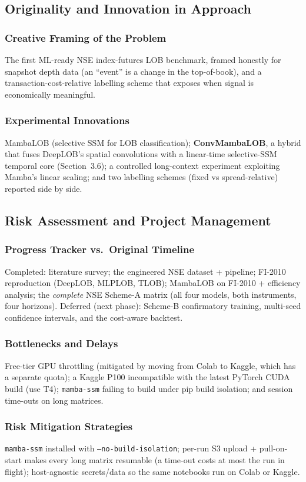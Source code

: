 \documentclass[11pt]{article}
\begin{document}
\subsection{Originality and Innovation in Approach}
\subsubsection{Creative Framing of the Problem}
The first ML-ready NSE index-futures LOB benchmark, framed honestly for snapshot depth data (an ``event''
is a change in the top-of-book), and a transaction-cost-relative labelling scheme that exposes when signal
is economically meaningful.
\subsubsection{Experimental Innovations}
MambaLOB (selective SSM for LOB classification); \textbf{ConvMambaLOB}, a hybrid that fuses DeepLOB's spatial
convolutions with a linear-time selective-SSM temporal core (Section~3.6); a controlled long-context
experiment exploiting Mamba's linear scaling; and two labelling schemes (fixed vs spread-relative) reported
side by side.

\subsection{Risk Assessment and Project Management}
\subsubsection{Progress Tracker vs.\ Original Timeline}
Completed: literature survey; the engineered NSE dataset + pipeline; FI-2010 reproduction (DeepLOB, MLPLOB,
TLOB); MambaLOB on FI-2010 + efficiency analysis; the \emph{complete} NSE Scheme-A matrix (all four models,
both instruments, four horizons). Deferred (next phase): Scheme-B confirmatory training, multi-seed
confidence intervals, and the cost-aware backtest.
\subsubsection{Bottlenecks and Delays}
Free-tier GPU throttling (mitigated by moving from Colab to Kaggle, which has a separate quota); a Kaggle
P100 incompatible with the latest PyTorch CUDA build (use T4); \texttt{mamba-ssm} failing to build under
pip build isolation; and session time-outs on long matrices.
\subsubsection{Risk Mitigation Strategies}
\texttt{mamba-ssm} installed with \texttt{--no-build-isolation}; per-run S3 upload + pull-on-start makes
every long matrix resumable (a time-out costs at most the run in flight); host-agnostic secrets/data so the
same notebooks run on Colab or Kaggle.
\end{document}
